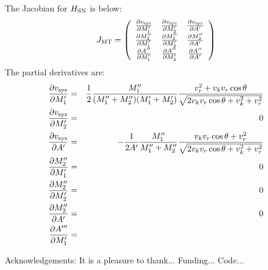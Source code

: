 \documentclass[12pt, preprint]{aastex}
\begin{document}
The Jacobian for $H_{\rm SN}$ is below:
\[  J_{\rm MT} = \left( \begin{array}{ccc}
\frac{\partial v_{\rm sys}}{\partial M_1'} & \frac{\partial v_{\rm sys}}{\partial M_2'} & \frac{\partial v_{\rm sys}}{\partial A'}  \\[0.3em]
\frac{\partial M_2''}{\partial M_1'}  & \frac{\partial M_2''}{\partial M_2'} & \frac{\partial M_2''}{\partial A'} \\[0.3em]
\frac{\partial A''}{\partial M_1'} & \frac{\partial A''}{\partial M_2'} & \frac{\partial A''}{\partial A'}  \end{array} \right)\]
The partial derivatives are:
\begin{eqnarray}
\frac{\partial v_{\rm sys}}{\partial M_1'} &=& \frac{1}{2} \frac{M_1''}{(M_1''+M_2'')(M_1'+M_2')} 
     \frac{v_r^2 + v_k v_r \cos \theta}{\sqrt{2 v_k v_r \cos \theta + v_k^2 + v_r^2}} \\
\frac{\partial v_{\rm sys}}{\partial M_2'} &=& 0 \\    
\frac{\partial v_{\rm sys}}{\partial A'} &=& -\frac{1}{2A'} \frac{M_1''}{M_1'' + M_2''} 
     \frac{v_k v_r \cos \theta + v_r^2 }{\sqrt{2 v_k v_r \cos \theta + v_k^2 + v_r^2}} \\
\frac{\partial M_2''}{\partial M_1'} &=& 0 \\
\frac{\partial M_2''}{\partial M_2'} &=& 0 \\
\frac{\partial M_2''}{\partial A'} &=& 0 \\
\frac{\partial A'''}{\partial M_1'} &=& 
\end{eqnarray}

\acknowledgements
Acknowledgements:
It is a pleasure to thank...
Funding...
Code...
\end{document}
